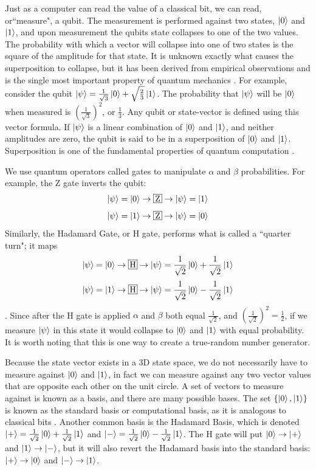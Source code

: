 Just as a computer can read the value of a classical bit, we can read, or``measure", a qubit.
The measurement is performed against two states, $\ket{0}$ and $\ket{1}$, and upon measurement the qubits state collapses to one of the two values.
The probability with which a vector will collapse into one of two states is the square of the amplitude for that state.
It is unknown exactly what causes the superposition to collapse, but it has been derived from empirical observations and is the single most important property of quantum mechanics \cite{qc:agi}.
For example, consider the qubit $\ket{\psi} = \frac{1}{\sqrt{3}}\ket{0} + \sqrt{\frac{2}{3}}\ket{1}$.
The probability that $\ket{\psi}$ will be $\ket{0}$ when measured is $(\frac{1}{\sqrt{3}})^2$, or $\frac{1}{3}$.
Any qubit or state-vector is defined using this vector formula.
If $\ket{\psi}$ is a linear combination of $\ket{0}$ and $\ket{1}$, and neither amplitudes are zero, the qubit is said to be in a superposition of $\ket{0}$ and $\ket{1}$.
Superposition is one of the fundamental properties of quantum computation \cite{qc:agi}. 

We use quantum operators called gates to manipulate $\alpha$ and $\beta$ probabilities.
For example, the Z gate inverts the qubit: $$\ket{\psi} = \ket{0} \rightarrow \textSq{Z} \rightarrow \ket{\psi} = \ket{1}$$ $$\ket{\psi} = \ket{1} \rightarrow \textSq{Z} \rightarrow \ket{\psi} = \ket{0}$$
Similarly, the Hadamard Gate, or H gate, performs what is called a ``quarter turn"; it maps $$\ket{\psi} = \ket{0} \rightarrow \textSq{H} \rightarrow \ket{\psi} = \frac{1}{\sqrt{2}}\ket{0} + \frac{1}{\sqrt{2}}\ket{1}$$  $$\ket{\psi} = \ket{1} \rightarrow \textSq{H} \rightarrow \ket{\psi} = \frac{1}{\sqrt{2}}\ket{0} - \frac{1}{\sqrt{2}}\ket{1}$$ \cite{qc:agi}.
Since after the H gate is applied $\alpha$ and $\beta$ both equal $\frac{1}{\sqrt{2}}$, and ${(\frac{1}{\sqrt{2}})}^2 = \frac{1}{2}$, if we measure $\ket{\psi}$ in this state it would collapse to $\ket{0}$ and $\ket{1}$ with equal probability. 
It is worth noting that this is one way to create a true-random number generator.

Because the state vector exists in a 3D state space, we do not necessarily have to measure against $\ket{0}$ and $\ket{1}$, in fact we can measure against any two vector values that are opposite each other on the unit circle. 
A set of vectors to measure against is known as a basis, and there are many possible bases. 
The set $\{\ket{0},\ket{1}\}$ is known as the standard basis or computational basis, as it is analogous to classical bits \cite{qcftgu}.
Another common basis is the Hadamard Basis, which is denoted $\ket{+} = \frac{1}{\sqrt{2}}\ket{0} + \frac{1}{\sqrt{2}}\ket{1}$ and $\ket{-} = \frac{1}{\sqrt{2}}\ket{0} - \frac{1}{\sqrt{2}}\ket{1}$.
The H gate will put $\ket{0} \rightarrow \ket{+}$ and $\ket{1} \rightarrow \ket{-}$, but it will also revert the Hadamard basis into the standard basis: $\ket{+} \rightarrow \ket{0}$ and $\ket{-} \rightarrow \ket{1}$.


